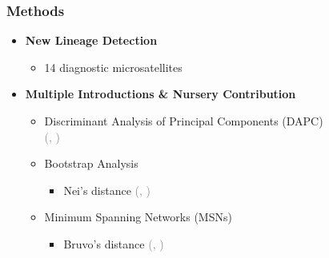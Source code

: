 \documentclass{beamer}\usepackage[]{graphicx}\usepackage[]{color}
\newcommand{\mycitep}[1]{\scriptsize{\textcolor{gray}{(\citeauthor{#1}, \citeyear{#1})}}}
\begin{document}
\begin{frame}[allowpagebreak,T]
	\frametitle{Methods}
	\begin{itemize}
		\Large
		\item<1-> \textbf{New Lineage Detection}
		\begin{itemize}
			\Large
			\item<1-> 14 diagnostic microsatellites
		\end{itemize}
		\item<2-> \textbf{Multiple Introductions \& Nursery Contribution}
		\begin{itemize}
			\Large
			\item<3-> Discriminant Analysis of Principal Components (DAPC)\\ \mycitep{jombart2010discriminant}
			\item<4-> Bootstrap Analysis
			\begin{itemize}
				\large
				\item<4-> Nei's distance \mycitep{nei1973analysis}
			\end{itemize}
			\item<5-> Minimum Spanning Networks (MSNs)
			\begin{itemize}
				\large
				\item<5-> Bruvo's distance \mycitep{bruvo2004simple}
			\end{itemize}
		\end{itemize}
	\end{itemize}
\end{frame}
\end{document}
